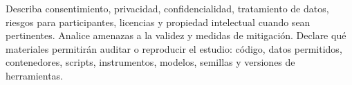 Describa consentimiento, privacidad, confidencialidad, tratamiento de datos,
riesgos para participantes, licencias y propiedad intelectual cuando sean
pertinentes. Analice amenazas a la validez y medidas de mitigación. Declare qué
materiales permitirán auditar o reproducir el estudio: código, datos permitidos,
contenedores, scripts, instrumentos, modelos, semillas y versiones de
herramientas.

